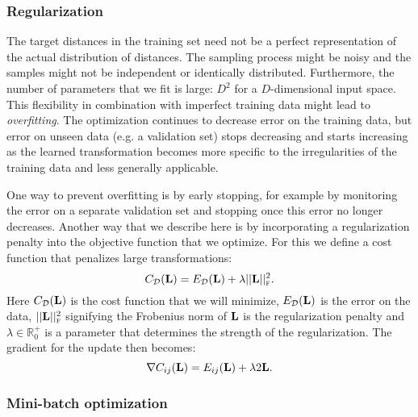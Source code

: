 \subsubsection{Regularization}

The target distances in the training set need not be a perfect representation of the actual distribution of distances. The sampling process might be noisy and the samples might not be independent or identically distributed. Furthermore, the number of parameters that we fit is large: $D^2$ for a $D$-dimensional input space. This flexibility in combination with imperfect training data might lead to \emph{overfitting}. The optimization continues to decrease error on the training data, but error on unseen data (e.g. a validation set) stops decreasing and starts increasing as the learned transformation becomes more specific to the irregularities of the training data and less generally applicable.

One way to prevent overfitting is by early stopping, for example by monitoring the error on a separate validation set and stopping once this error no longer decreases. Another way that we describe here is by incorporating a regularization penalty into the objective function that we optimize. For this we define a cost function that penalizes large transformations:
\begin{equation}
C_{\mathcal{D}}(\mathbf{L}) =  E_{\mathcal{D}}(\mathbf{L}) + \lambda ||\mathbf{L}||_\textsc{f}^2.
\label{eq:structured_risk}
\end{equation}
Here $C_{\mathcal{D}}(\mathbf{L})$ is the cost function that we will minimize, $E_{\mathcal{D}}(\mathbf{L})$ is the error on the data, $ ||\mathbf{L}||_\textsc{f}^2$ signifying the Frobenius norm of $\mathbf{L}$ is the regularization penalty and $\lambda \in \mathbb{R}_0^+$ is a parameter that determines the strength of the regularization. The gradient for the update then becomes:
\begin{equation}
\nabla C_{ij}(\mathbf{L}) =  E_{ij}(\mathbf{L}) + \lambda 2\mathbf{L}.
\label{eq:structured_grad}
\end{equation}


\subsubsection{Mini-batch optimization}

